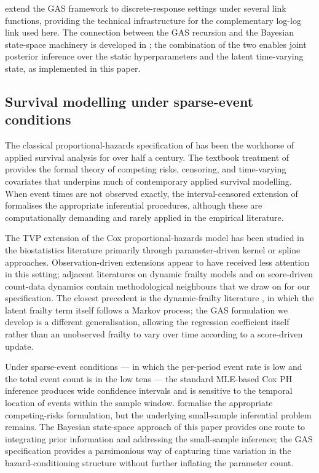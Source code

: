 \documentclass[12pt,a4paper]{article}
\theoremstyle{plain}
\theoremstyle{definition}
\begin{document}
\cite{koopman2016predicting} extend the GAS framework to discrete-response settings under several link functions, providing the technical infrastructure for the complementary log-log link used here. The connection between the GAS recursion and the Bayesian state-space machinery is developed in \cite{durbin2012time}; the combination of the two enables joint posterior inference over the static hyperparameters and the latent time-varying state, as implemented in this paper.

\subsection{Survival modelling under sparse-event conditions}

The classical proportional-hazards specification of \cite{cox1972regression} has been the workhorse of applied survival analysis for over half a century. The textbook treatment of \cite{klein2003survival} provides the formal theory of competing risks, censoring, and time-varying covariates that underpins much of contemporary applied survival modelling. When event times are not observed exactly, the interval-censored extension of \cite{sun2006statistical} formalises the appropriate inferential procedures, although these are computationally demanding and rarely applied in the empirical literature.

The TVP extension of the Cox proportional-hazards model has been studied in the biostatistics literature primarily through parameter-driven kernel or spline approaches. Observation-driven extensions appear to have received less attention in this setting; adjacent literatures on dynamic frailty models \citep{robins2000marginal} and on score-driven count-data dynamics \citep{creal2013generalized} contain methodological neighbours that we draw on for our specification. The closest precedent is the dynamic-frailty literature \citep{robins2000marginal}, in which the latent frailty term itself follows a Markov process; the GAS formulation we develop is a different generalisation, allowing the regression coefficient itself rather than an unobserved frailty to vary over time according to a score-driven update.

Under sparse-event conditions --- in which the per-period event rate is low and the total event count is in the low tens --- the standard MLE-based Cox PH inference produces wide confidence intervals and is sensitive to the temporal location of events within the sample window. \cite{fine1999proportional} formalise the appropriate competing-risks formulation, but the underlying small-sample inferential problem remains. The Bayesian state-space approach of this paper provides one route to integrating prior information and addressing the small-sample inference; the GAS specification provides a parsimonious way of capturing time variation in the hazard-conditioning structure without further inflating the parameter count.
\end{document}
